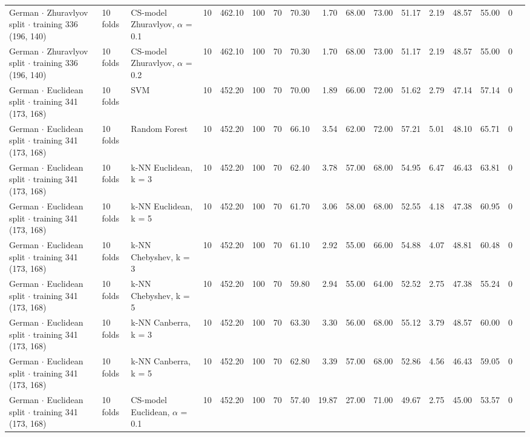 \begin{longtable}{lllrrrrrrrrrrrrrl}
  German $\cdot$ Zhuravlyov split $\cdot$ training 336 (196, 140) & 10 folds & CS-model Zhuravlyov, $\alpha$ = 0.1 & 10 & 462.10 & 100 & 70 & 70.30 & 1.70 & 68.00 & 73.00 & 51.17 & 2.19 & 48.57 & 55.00 & 0 &  \\
  German $\cdot$ Zhuravlyov split $\cdot$ training 336 (196, 140) & 10 folds & CS-model Zhuravlyov, $\alpha$ = 0.2 & 10 & 462.10 & 100 & 70 & 70.30 & 1.70 & 68.00 & 73.00 & 51.17 & 2.19 & 48.57 & 55.00 & 0 &  \\
  German $\cdot$ Euclidean split $\cdot$ training 341 (173, 168) & 10 folds & SVM & 10 & 452.20 & 100 & 70 & 70.00 & 1.89 & 66.00 & 72.00 & 51.62 & 2.79 & 47.14 & 57.14 & 0 &  \\
  German $\cdot$ Euclidean split $\cdot$ training 341 (173, 168) & 10 folds & Random Forest & 10 & 452.20 & 100 & 70 & 66.10 & 3.54 & 62.00 & 72.00 & 57.21 & 5.01 & 48.10 & 65.71 & 0 &  \\
  German $\cdot$ Euclidean split $\cdot$ training 341 (173, 168) & 10 folds & k-NN Euclidean, k = 3 & 10 & 452.20 & 100 & 70 & 62.40 & 3.78 & 57.00 & 68.00 & 54.95 & 6.47 & 46.43 & 63.81 & 0 &  \\
  German $\cdot$ Euclidean split $\cdot$ training 341 (173, 168) & 10 folds & k-NN Euclidean, k = 5 & 10 & 452.20 & 100 & 70 & 61.70 & 3.06 & 58.00 & 68.00 & 52.55 & 4.18 & 47.38 & 60.95 & 0 &  \\
  German $\cdot$ Euclidean split $\cdot$ training 341 (173, 168) & 10 folds & k-NN Chebyshev, k = 3 & 10 & 452.20 & 100 & 70 & 61.10 & 2.92 & 55.00 & 66.00 & 54.88 & 4.07 & 48.81 & 60.48 & 0 &  \\
  German $\cdot$ Euclidean split $\cdot$ training 341 (173, 168) & 10 folds & k-NN Chebyshev, k = 5 & 10 & 452.20 & 100 & 70 & 59.80 & 2.94 & 55.00 & 64.00 & 52.52 & 2.75 & 47.38 & 55.24 & 0 &  \\
  German $\cdot$ Euclidean split $\cdot$ training 341 (173, 168) & 10 folds & k-NN Canberra, k = 3 & 10 & 452.20 & 100 & 70 & 63.30 & 3.30 & 56.00 & 68.00 & 55.12 & 3.79 & 48.57 & 60.00 & 0 &  \\
  German $\cdot$ Euclidean split $\cdot$ training 341 (173, 168) & 10 folds & k-NN Canberra, k = 5 & 10 & 452.20 & 100 & 70 & 62.80 & 3.39 & 57.00 & 68.00 & 52.86 & 4.56 & 46.43 & 59.05 & 0 &  \\
  German $\cdot$ Euclidean split $\cdot$ training 341 (173, 168) & 10 folds & CS-model Euclidean, $\alpha$ = 0.1 & 10 & 452.20 & 100 & 70 & 57.40 & 19.87 & 27.00 & 71.00 & 49.67 & 2.75 & 45.00 & 53.57 & 0 &  \\

\end{longtable}

